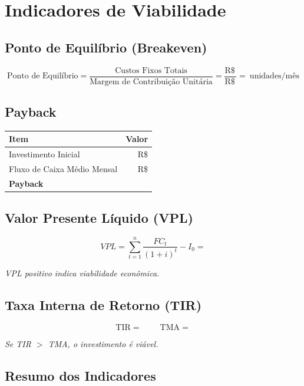 \documentclass[
	12pt,
	openright,
	oneside,
	a4paper,
	chapter=TITLE,
	section=TITLE,
	english,
	brazil
	]{abntex2}
\newcommand{\tcampo}[1]{%
	{#1}%
}
\newcommand{\instrucao}[1]{%
	\vspace{0.3cm}%
	\noindent%
	{%
		\setlength{\fboxsep}{6pt}%
		\colorbox{azul-claro}{%
			\begin{minipage}{\dimexpr\textwidth-2\fboxsep\relax}%
				\setlength{\parindent}{1.25cm}%
				{\color{cinza-instrucao}\small\itshape #1}%
			\end{minipage}%
		}%
	}%
	\vspace{0.3cm}%
}
\begin{document}
\section{Indicadores de Viabilidade}

\subsection{Ponto de Equilíbrio (Breakeven)}

\[
\text{Ponto de Equilíbrio} = \frac{\text{Custos Fixos Totais}}{\text{Margem de Contribuição Unitária}}
= \frac{\text{R\$ }\,\tcampo{}}{\text{R\$ }\,\tcampo{}}
= \tcampo{}\ \text{unidades/mês}
\]

\subsection{Payback}

\centering
\begin{tabularx}{\textwidth}{X r}
\toprule
\rowcolor{azul-claro}
\textbf{Item} & \textbf{Valor} \\
\midrule
Investimento Inicial            & R\$ \tcampo{} \\
Fluxo de Caixa Médio Mensal     & R\$ \tcampo{} \\
\textbf{Payback}                & \tcampo{} \\
\bottomrule
\end{tabularx}

\subsection{Valor Presente Líquido (VPL)}

\[
VPL = \sum_{t=1}^{n} \frac{FC_t}{(1 + i)^t} - I_0
= \tcampo{}
\]

\instrucao{VPL positivo indica viabilidade econômica.}

\subsection{Taxa Interna de Retorno (TIR)}

\[
\text{TIR} = \tcampo{}\ \qquad
\text{TMA} = \tcampo{}
\]

\instrucao{Se TIR $>$ TMA, o investimento é viável.}

\subsection{Resumo dos Indicadores}
\end{document}
